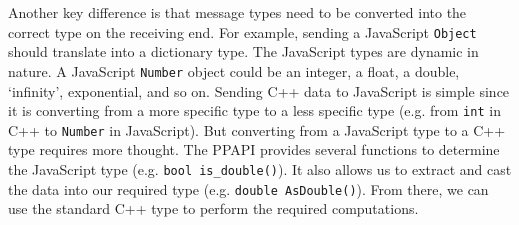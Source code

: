 Another key difference is that message types need to be converted into the correct type on the receiving end. For example, sending a JavaScript \lstinline+Object+ should translate into a dictionary type. The JavaScript types are dynamic in nature. A JavaScript \lstinline+Number+ object could be an integer, a float, a double, `infinity', exponential, and so on. Sending C++ data to JavaScript is simple since it is converting from a more specific type to a less specific type (e.g. from \lstinline+int+ in C++ to \lstinline+Number+ in JavaScript). But converting from a JavaScript type to a C++ type requires more thought. The PPAPI provides several functions to determine the JavaScript type (e.g. \lstinline+bool is_double()+). It also allows us to extract and cast the data into our required type (e.g. \lstinline+double AsDouble()+). From there, we can use the standard C++ type to perform the required computations.


